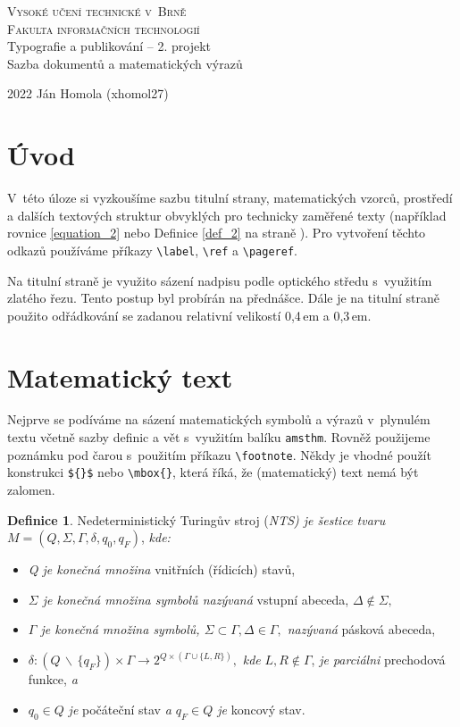 \documentclass[a4paper, 11pt, twocolumn]{article}
\theoremstyle{definition}
\newtheorem{definition}{Definice}
\begin{document}
\begin{titlepage}
\begin{center}
    \Huge
    \textsc{{\Huge Vysoké učení technické v~Brně}\\
            {\huge Fakulta informačních technologií}}\\
    {\LARGE Typografie a publikování -- 2. projekt\\
    Sazba dokumentů a matematických výrazů}
\end{center}
{\LARGE 2022 \hfill Ján Homola (xhomol27)}
\end{titlepage}
    


\section*{Úvod}
V~této úloze si vyzkoušíme sazbu titulní strany, matematických vzorců, prostředí a dalších textových struktur obvyklých pro technicky zaměřené texty (například rovnice \eqref{equation_2} nebo Definice \ref{def_2} na straně \pageref{def_2}). Pro vytvoření těchto odkazů používáme příkazy \verb|\label|, \verb|\ref| a \verb|\pageref|. \par
Na titulní straně je využito sázení nadpisu podle optického středu s~využitím zlatého řezu. Tento postup byl probírán na přednášce. Dále je na titulní straně použito odřádkování se zadanou relativní velikostí 0,4\,em a 0,3\,em.

\section{Matematický text}
Nejprve se podíváme na sázení matematických symbolů a výrazů v~plynulém textu včetně sazby definic a vět s~využitím balíku \texttt{amsthm}. Rovněž použijeme poznámku pod čarou s~použitím příkazu \verb|\footnote|. Někdy je vhodné použít konstrukci \verb|${}$| nebo \verb|\mbox{}|, která říká, že (matematický) text nemá být zalomen. 

\begin{definition}
\label{def_1}
Nedeterministický Turingův stroj (\emph{NTS) je šestice tvaru} $M = (Q, \Sigma, \Gamma, \delta, q_0, q_F)$, \emph{kde:}
\begin{itemize}
    \item \emph{Q je konečná množina} vnitřních (řídicích) stavů, 
    \item \emph{$\Sigma$ je konečná množina symbolů nazývaná} vstupní abeceda, $\Delta \notin \Sigma,$
    \item \emph{$\Gamma$ je konečná množina symbolů, $\Sigma \subset \Gamma, \Delta \in \Gamma,$ nazývaná} pásková abeceda,
    \item  $\delta:(Q \,\backslash \,\{q_F\}) \times \Gamma \rightarrow 2^{Q \times(\Gamma \cup\{L, R\})},$ \emph{kde} $L, R \notin \Gamma$, \emph{je parciálni} prechodová funkce, \emph{a}
    \item $q_0 \in Q$ \emph{je} počáteční stav \emph{a $q_F \in Q$ je} koncový stav.
\end{itemize}
\end{definition}
\end{document}
